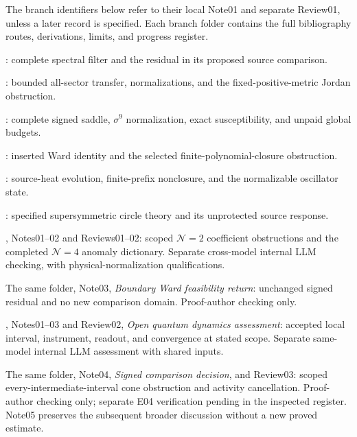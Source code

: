 \documentclass[11pt,letterpaper]{article}
\numberwithin{equation}{section}
\theoremstyle{remark}
\newcommand{\evid}[1]{\textsf{[#1]}}
\begin{document}
The branch identifiers below refer to their local Note01 and separate
Review01, unless a later record is specified. Each branch folder contains
the full bibliography routes, derivations, limits, and progress register.
\begin{description}[style=nextline,leftmargin=2.5em]
\item[\evid{P1}] : complete spectral filter and
the residual in its proposed source comparison.
\item[\evid{P2}] : bounded all-sector transfer,
normalizations, and the fixed-positive-metric Jordan obstruction.
\item[\evid{P3}] : complete signed saddle,
$\sigma^9$ normalization, exact susceptibility, and unpaid global budgets.
\item[\evid{P4}] : inserted Ward identity
and the selected finite-polynomial-closure obstruction.
\item[\evid{P5}] : source-heat evolution,
finite-prefix nonclosure, and the normalizable oscillator state.
\item[\evid{P6}] : specified supersymmetric
circle theory and its unprotected source response.
\item[\evid{G1}] , Notes01--02 and
Reviews01--02: scoped $\mathcal N=2$ coefficient obstructions and the
completed $\mathcal N=4$ anomaly dictionary. Separate cross-model
internal LLM checking, with physical-normalization qualifications.
\item[\evid{G2}] The same folder, Note03, \emph{Boundary Ward feasibility
return}: unchanged signed residual and no new comparison domain.
Proof-author checking only.
\item[\evid{O1}] , Notes01--03 and Review02,
\emph{Open quantum dynamics assessment}: accepted local interval,
instrument, readout, and convergence at stated scope. Separate same-model
internal LLM assessment with shared inputs.
\item[\evid{O2}] The same folder, Note04, \emph{Signed comparison decision},
and Review03: scoped every-intermediate-interval cone obstruction and
activity cancellation. Proof-author checking only; separate E04
verification pending in the inspected register. Note05 preserves the
subsequent broader discussion without a new proved estimate.
\end{description}
\end{document}
